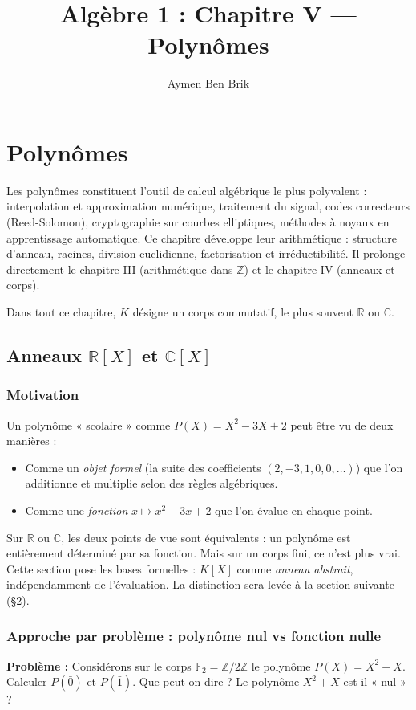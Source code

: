\documentclass[12pt,a4paper]{report}
\title{Algèbre 1 : Chapitre V --- Polynômes}
\author{Aymen Ben Brik}
\date{}
\theoremstyle{definition}
\theoremstyle{remark}
\begin{document}
\maketitle

\setcounter{chapter}{4}
\chapter{Polynômes}

Les polynômes constituent l'outil de calcul algébrique le plus polyvalent : interpolation et approximation numérique, traitement du signal, codes correcteurs (Reed-Solomon), cryptographie sur courbes elliptiques, méthodes à noyaux en apprentissage automatique. Ce chapitre développe leur arithmétique : structure d'anneau, racines, division euclidienne, factorisation et irréductibilité. Il prolonge directement le chapitre III (arithmétique dans $\mathbb{Z}$) et le chapitre IV (anneaux et corps).

Dans tout ce chapitre, $K$ désigne un corps commutatif, le plus souvent $\mathbb{R}$ ou $\mathbb{C}$.

\section{Anneaux $\mathbb{R}[X]$ et $\mathbb{C}[X]$}

\subsection{Motivation}
Un polynôme « scolaire » comme $P(X) = X^2 - 3X + 2$ peut être vu de deux manières :
\begin{itemize}
    \item Comme un \emph{objet formel} (la suite des coefficients $(2, -3, 1, 0, 0, \dots)$) que l'on additionne et multiplie selon des règles algébriques.
    \item Comme une \emph{fonction} $x \mapsto x^2 - 3x + 2$ que l'on évalue en chaque point.
\end{itemize}
Sur $\mathbb{R}$ ou $\mathbb{C}$, les deux points de vue sont équivalents : un polynôme est entièrement déterminé par sa fonction. Mais sur un corps fini, ce n'est plus vrai. Cette section pose les bases formelles : $K[X]$ comme \emph{anneau abstrait}, indépendamment de l'évaluation. La distinction sera levée à la section suivante (§2).

\subsection{Approche par problème : polynôme nul vs fonction nulle}
\textbf{Problème :} Considérons sur le corps $\mathbb{F}_2 = \mathbb{Z}/2\mathbb{Z}$ le polynôme $P(X) = X^2 + X$. Calculer $P(\bar{0})$ et $P(\bar{1})$. Que peut-on dire ? Le polynôme $X^2 + X$ est-il « nul » ?
\end{document}

